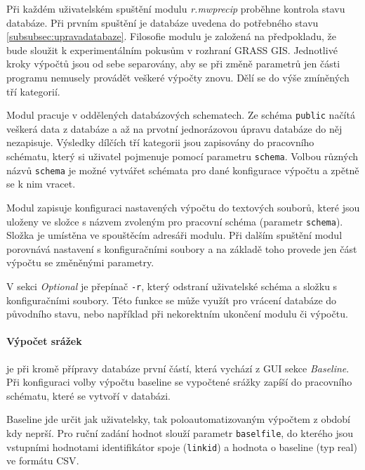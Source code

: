\documentclass[a4paper,12pt,oneside]{report}
\begin{document}
Při každém uživatelském spuštění modulu \textit{r.mwprecip } proběhne kontrola stavu databáze. Při prvním spuštění je databáze uvedena do potřebného stavu \ref{subsubsec:upravadatabaze}. Filosofie modulu je založená na předpokladu, že bude sloužit k experimentálním pokusům v rozhraní GRASS GIS. Jednotlivé kroky výpočtů jsou od sebe separovány, aby se při změně parametrů jen části programu nemusely provádět veškeré výpočty znovu. Dělí se do výše zmíněných tří kategorií. 

Modul pracuje v oddělených databázových schematech. Ze schéma \texttt{public} načítá veškerá data z databáze a až na prvotní jednorázovou úpravu databáze do něj nezapisuje. Výsledky dílčích tří kategorii jsou zapisovány do pracovního schématu, který si uživatel pojmenuje pomocí parametru \texttt{schema}.  Volbou různých názvů  \texttt{schema} je možné vytvářet schémata pro dané konfigurace výpočtu a zpětně se k nim vracet.

Modul zapisuje konfiguraci nastavených výpočtu do textových souborů, které jsou uloženy ve složce s názvem zvoleným pro pracovní schéma (parametr \texttt{schema}). Složka je umístěna ve spouštěcím adresáři modulu. Při dalším spuštění modul porovnává nastavení s konfiguračními soubory a na základě toho provede jen   část výpočtu se změněnými parametry. 

V sekci \textit{Optional} je přepínač \texttt{-r}, který odstraní uživatelské schéma a složku s konfiguračními soubory. Této funkce se může využít pro vrácení databáze do původního stavu, nebo například při nekorektním ukončení modulu či výpočtu.


\paragraph*{Výpočet srážek} je při kromě přípravy databáze první částí, která vychází z \acs{GUI} sekce \textit{Baseline}. Při konfiguraci volby výpočtu baseline se vypočtené srážky zapíší do pracovního schématu, které se vytvoří v databázi.

Baseline jde určit jak uživatelsky,  tak poloautomatizovaným výpočtem z období kdy neprší. 
Pro ruční zadání hodnot slouží parametr \texttt{baselfile}, do kterého jsou vstupními hodnotami identifikátor spoje (\texttt{linkid}) a hodnota o baseline (typ real) ve formátu \acs{CSV}.
\end{document}
